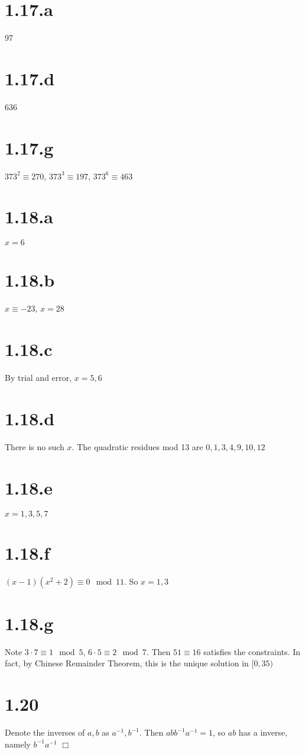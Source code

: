 \documentclass{article}
\begin{document}
\section*{1.17.a}
97
\section*{1.17.d}
636
\section*{1.17.g}
$373^2 \equiv 270$, $373^3 \equiv 197$, $373^6 \equiv 463$

\section*{1.18.a}
$x = 6$
\section*{1.18.b}
$x \equiv -23$, $x = 28$
\section*{1.18.c}
By trial and error, $x = 5,6$
\section*{1.18.d}
There is no such $x$. The quadratic residues mod 13 are $0,1,3,4,9,10,12$
\section*{1.18.e}
$x = 1,3,5,7$
\section*{1.18.f}
$(x-1)(x^2+2) \equiv 0 \mod 11$. So $x = 1,3$
\section*{1.18.g}
Note $3\cdot 7 \equiv 1 \mod 5$, $6\cdot 5 \equiv 2 \mod 7$. Then $51 \equiv 16$ satisfies the constraints. In fact, by Chinese Remainder Theorem, this is the unique solution in $[0,35)$

\section*{1.20}
Denote the inverses of $a,b$ as $a^{-1}, b^{-1}$. Then $abb^{-1}a^{-1} = 1$, so $ab$ has a inverse, namely $b^{-1}a^{-1}$ $\Box$
\end{document}

